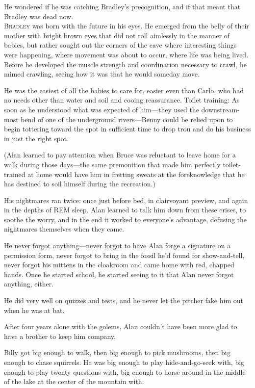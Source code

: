 \documentclass{article}
\begin{document}
He wondered if he was catching Bradley's precognition, and if that
meant that Bradley was dead now.
\\
\lettrine[lines=3, lhang=.5, nindent=0pt, findent=2pt]{B}{radley} was born with the future in his eyes.  He emerged from the
belly of their mother with bright brown eyes that did not roll
aimlessly in the manner of babies, but rather sought out the corners
of the cave where interesting things were happening, where movement
was about to occur, where life was being lived.  Before he developed
the muscle strength and coordination necessary to crawl, he mimed
crawling, seeing how it was that he would someday move.

He was the easiest of all the babies to care for, easier even than
Carlo, who had no needs other than water and soil and cooing
reassurance.  Toilet training:  As soon as he understood what was
expected of him---they used the downstream-most bend of one of the
underground rivers---Benny could be relied upon to begin tottering
toward the spot in sufficient time to drop trou and do his business in
just the right spot.

(Alan learned to pay attention when Bruce was reluctant to leave home
for a walk during those days---the same premonition that made him
perfectly toilet-trained at home would have him in fretting sweats at
the foreknowledge that he has destined to soil himself during the
recreation.)

His nightmares ran twice:  once just before bed, in clairvoyant
preview, and again in the depths of REM sleep.  Alan learned to talk
him down from these crises, to soothe the worry, and in the end it
worked to everyone's advantage, defusing the nightmares themselves
when they came.

He never forgot anything---never forgot to have Alan forge a signature
on a permission form, never forgot to bring in the fossil he'd found
for show-and-tell, never forgot his mittens in the cloakroom and came
home with red, chapped hands.  Once he started school, he started
seeing to it that Alan never forgot anything, either.

He did very well on quizzes and tests, and he never let the pitcher
fake him out when he was at bat.

After four years alone with the golems, Alan couldn't have been more
glad to have a brother to keep him company.

Billy got big enough to walk, then big enough to pick mushrooms, then
big enough to chase squirrels.  He was big enough to play
hide-and-go-seek with, big enough to play twenty questions with, big
enough to horse around in the middle of the lake at the center of the
mountain with.
\end{document}
